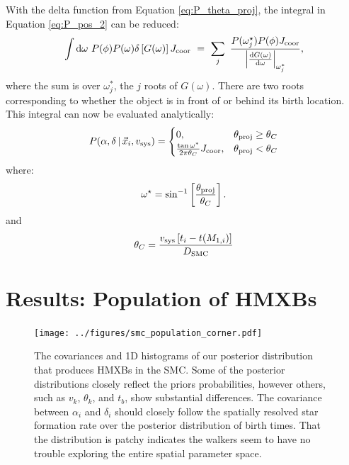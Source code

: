 \documentclass[usenatbib]{mnras}
\newcommand{\given}{\,|\,}
\newcommand{\dd}{\mathrm{d}}
\begin{document}
With the delta function from Equation \ref{eq:P_theta_proj}, the integral in Equation \ref{eq:P_pos_2} can be reduced:
\begin{equation}
\int \dd \omega\ P(\phi) P(\omega) \delta \left[ G(\omega) \right]  J_{\rm coor}\  =\ \sum_j\ \frac{P(\omega_j^{\star}) P(\phi)  J_{\rm coor}}{ \left| \frac{ \dd G (\omega) }{\dd \omega} \right|_{\omega_j^*}},
\end{equation}
where the sum is over $\omega_j^*$, the $j$ roots of $G(\omega)$. There are two roots corresponding to whether the object is in front of or behind its birth location. This integral can now be evaluated analytically:
\begin{equation}
P(\alpha, \delta \given \vec{x}_i, v_{\rm sys} ) =
\begin{cases} 
      0, & \theta_{\rm proj} \geq \theta_C\\
     \frac{\tan \omega^*}{2 \pi \theta_C}  J_{\rm coor}, & \theta_{\rm proj} < \theta_C 
   \end{cases}
\end{equation}
where:
\begin{equation}
\omega^{\star} = \sin^{-1} \left[ \frac{\theta_{\rm proj}}{\theta_C} \right].
\end{equation}
and
\begin{equation}
\theta_C = \frac{v_{\rm sys} \left[ t_i - t(M_{1,i}) \right]}{D_{\rm SMC}} \label{eq:theta_c}
\end{equation}




\section{Results: Population of HMXBs} \label{sec:results_population}


\begin{figure}
\begin{center}
\texttt{[image: ../figures/smc\_population\_corner.pdf]}
\caption{ The covariances and 1D histograms of our posterior distribution that produces HMXBs in the SMC. Some of the posterior distributions closely reflect the priors probabilities, however others, such as $v_k$, $\theta_k$, and $t_b$, show substantial differences. The covariance between $\alpha_i$ and $\delta_i$ should closely follow the spatially resolved star formation rate over the posterior distribution of birth times. That the distribution is patchy indicates the walkers seem to have no trouble exploring the entire spatial parameter space.}
\label{fig:population_corner}
\end{center}
\end{figure}
\end{document}
